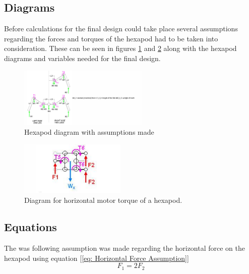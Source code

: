 \subsection{Diagrams}
Before calculations for the final design could take place several assumptions regarding the forces and torques of the hexapod had to be taken into consideration. These can be seen in figures \ref{fig: Diagram 1} and \ref{fig:Diagram 2} along with the hexapod diagrams and variables needed for  the final design.




 





\begin{figure}

 \centering
   \includegraphics[width = 0.55\textwidth]{figures/1.png}                \caption{Hexapod diagram with assumptions made}
   \label{fig: Diagram 1}
\end{figure}

\begin{figure}
 \centering
   \includegraphics[width = 0.45\textwidth]{figures/2.png}
\caption{Diagram for horizontal motor torque of a hexapod.}
    \label{fig:Diagram 2}
\end{figure}



\subsection{Equations}
The was following assumption was made regarding the horizontal force on the hexapod using equation [\ref{eq: Horizontal Force Assumption}]
\begin{equation} \label{eq: Horizontal Force Assumption}
	F_1 = 2F_2
\end{equation}


